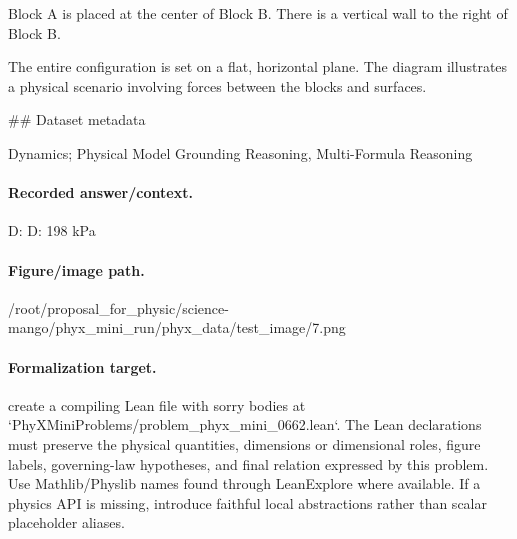 Block A is placed at the center of Block B. There is a vertical wall to the right of Block B. 

The entire configuration is set on a flat, horizontal plane. The diagram illustrates a physical scenario involving forces between the blocks and surfaces.

\#\# Dataset metadata

Dynamics; Physical Model Grounding Reasoning, Multi-Formula Reasoning

\paragraph{Recorded answer/context.}
D: D: 198 kPa

\paragraph{Figure/image path.}
/root/proposal\_for\_physic/science-mango/phyx\_mini\_run/phyx\_data/test\_image/7.png

\paragraph{Formalization target.}
create a compiling Lean file with sorry bodies at `PhyXMiniProblems/problem\_phyx\_mini\_0662.lean`. The Lean declarations must preserve the physical quantities, dimensions or dimensional roles, figure labels, governing-law hypotheses, and final relation expressed by this problem.
Use Mathlib/Physlib names found through LeanExplore where available. If a physics API is missing, introduce faithful local abstractions rather than scalar placeholder aliases.

